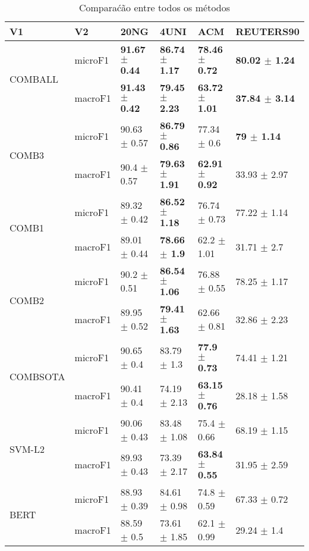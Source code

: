 \documentclass[]{article}
\begin{document}
\begin{table}[ht]
\centering
\begin{tabular}{llllll}
  \hline
V1 & V2 & 20NG & 4UNI & ACM & REUTERS90 \\ 
  \cline{3-6} \hline
\multirow{2}{*}{COMBALL} & microF1 & \bf{91.67 $\pm$  0.44} & \bf{86.74 $\pm$  1.17} & \bf{78.46 $\pm$  0.72} & \bf{80.02 $\pm$  1.24} \\ 
   & macroF1 & \bf{91.43 $\pm$  0.42} & \bf{79.45 $\pm$  2.23} & \bf{63.72 $\pm$  1.01} & \bf{37.84 $\pm$  3.14} \\ 
   \cline{3-6}\multirow{2}{*}{COMB3} & microF1 & 90.63 $\pm$  0.57 & \bf{86.79 $\pm$  0.86} & 77.34 $\pm$  0.6 & \bf{79 $\pm$  1.14} \\ 
   & macroF1 & 90.4 $\pm$  0.57 & \bf{79.63 $\pm$  1.91} & \bf{62.91 $\pm$  0.92} & 33.93 $\pm$  2.97 \\ 
   \cline{3-6}\multirow{2}{*}{COMB1} & microF1 & 89.32 $\pm$  0.42 & \bf{86.52 $\pm$  1.18} & 76.74 $\pm$  0.73 & 77.22 $\pm$  1.14 \\ 
   & macroF1 & 89.01 $\pm$  0.44 & \bf{78.66 $\pm$  1.9} & 62.2 $\pm$  1.01 & 31.71 $\pm$  2.7 \\ 
   \cline{3-6}\multirow{2}{*}{COMB2} & microF1 & 90.2 $\pm$  0.51 & \bf{86.54 $\pm$  1.06} & 76.88 $\pm$  0.55 & 78.25 $\pm$  1.17 \\ 
   & macroF1 & 89.95 $\pm$  0.52 & \bf{79.41 $\pm$  1.63} & 62.66 $\pm$  0.81 & 32.86 $\pm$  2.23 \\ 
   \cline{3-6}\multirow{2}{*}{COMBSOTA} & microF1 & 90.65 $\pm$  0.4 & 83.79 $\pm$  1.3 & \bf{77.9 $\pm$  0.73} & 74.41 $\pm$  1.21 \\ 
   & macroF1 & 90.41 $\pm$  0.4 & 74.19 $\pm$  2.13 & \bf{63.15 $\pm$  0.76} & 28.18 $\pm$  1.58 \\ 
   \cline{3-6}\multirow{2}{*}{SVM-L2} & microF1 & 90.06 $\pm$  0.43 & 83.48 $\pm$  1.08 & 75.4 $\pm$  0.66 & 68.19 $\pm$  1.15 \\ 
   & macroF1 & 89.93 $\pm$  0.43 & 73.39 $\pm$  2.17 & \bf{63.84 $\pm$  0.55} & 31.95 $\pm$  2.59 \\ 
   \cline{3-6}\multirow{2}{*}{BERT} & microF1 & 88.93 $\pm$  0.39 & 84.61 $\pm$  0.98 & 74.8 $\pm$  0.59 & 67.33 $\pm$  0.72 \\ 
   & macroF1 & 88.59 $\pm$  0.5 & 73.61 $\pm$  1.85 & 62.1 $\pm$  0.99 & 29.24 $\pm$  1.4 \\ 
   \cline{3-6}\end{tabular}
\caption{Comparaćão entre todos os métodos} 
\end{table}
\end{document}
